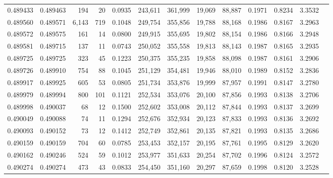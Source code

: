 \begin{tabular}{rrrrrrrrrrrrr}
0.489433 & 0.489463 &   194 &    20 &                                     0.0935 & 243,611 & 361,999 &  19,069 &  88,887 & 0.1971 & 0.8234 & 3.3532 \\
0.489560 & 0.489571 & 6,143 &   719 &                                     0.1048 & 249,754 & 355,856 &  19,788 &  88,168 & 0.1986 & 0.8167 & 3.2963 \\
0.489572 & 0.489575 &   161 &    14 &                                     0.0800 & 249,915 & 355,695 &  19,802 &  88,154 & 0.1986 & 0.8166 & 3.2948 \\
0.489581 & 0.489715 &   137 &    11 &                                     0.0743 & 250,052 & 355,558 &  19,813 &  88,143 & 0.1987 & 0.8165 & 3.2935 \\
0.489725 & 0.489725 &   323 &    45 &                                     0.1223 & 250,375 & 355,235 &  19,858 &  88,098 & 0.1987 & 0.8161 & 3.2906 \\
0.489726 & 0.489910 &   754 &    88 &                                     0.1045 & 251,129 & 354,481 &  19,946 &  88,010 & 0.1989 & 0.8152 & 3.2836 \\
0.489917 & 0.489925 &   605 &    53 &                                     0.0805 & 251,734 & 353,876 &  19,999 &  87,957 & 0.1991 & 0.8147 & 3.2780 \\
0.489979 & 0.489994 &   800 &   101 &                                     0.1121 & 252,534 & 353,076 &  20,100 &  87,856 & 0.1993 & 0.8138 & 3.2706 \\
0.489998 & 0.490037 &    68 &    12 &                                     0.1500 & 252,602 & 353,008 &  20,112 &  87,844 & 0.1993 & 0.8137 & 3.2699 \\
0.490049 & 0.490088 &    74 &    11 &                                     0.1294 & 252,676 & 352,934 &  20,123 &  87,833 & 0.1993 & 0.8136 & 3.2692 \\
0.490093 & 0.490152 &    73 &    12 &                                     0.1412 & 252,749 & 352,861 &  20,135 &  87,821 & 0.1993 & 0.8135 & 3.2686 \\
0.490159 & 0.490159 &   704 &    60 &                                     0.0785 & 253,453 & 352,157 &  20,195 &  87,761 & 0.1995 & 0.8129 & 3.2620 \\
0.490162 & 0.490246 &   524 &    59 &                                     0.1012 & 253,977 & 351,633 &  20,254 &  87,702 & 0.1996 & 0.8124 & 3.2572 \\
0.490274 & 0.490274 &   473 &    43 &                                     0.0833 & 254,450 & 351,160 &  20,297 &  87,659 & 0.1998 & 0.8120 & 3.2528 \\

\end{tabular}
